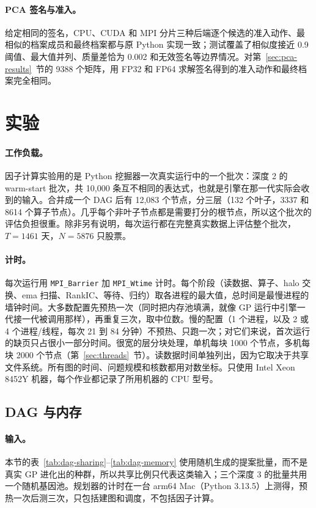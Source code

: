 \documentclass[11pt,a4paper,UTF8,fontset=fandol]{ctexart}
\newcommand{\code}[1]{\texttt{#1}}
\begin{document}
\paragraph{PCA 签名与准入。}给定相同的签名，CPU、CUDA 和 MPI 分片三种后端逐个候选的准入动作、最相似的档案成员和最终档案都与原 Python 实现一致；测试覆盖了相似度接近 0.9 阈值、最大值并列、质量差恰为 0.002 和无效签名等边界情况。对第~\ref{sec:pca-results}~节的 9388 个矩阵，用 FP32 和 FP64 求解签名得到的准入动作和最终档案完全相同。

\section{实验}
\label{sec:experiments}
\paragraph{工作负载。}因子计算实验用的是 Python 挖掘器一次真实运行中的一个批次：深度 2 的 warm-start 批次，共 10{,}000 条互不相同的表达式，也就是引擎在那一代实际会收到的输入。合并成一个 DAG 后有 12{,}083 个节点，分三层（132 个叶子，3337 和 8614 个算子节点）。几乎每个非叶子节点都是需要打分的根节点，所以这个批次的评估负担很重。除非另有说明，每次运行都在完整真实数据上评估整个批次，$T=1461$ 天，$N=5876$ 只股票。

\paragraph{计时。}每次运行用 \code{MPI\_Barrier} 加 \code{MPI\_Wtime} 计时。每个阶段（读数据、算子、halo 交换、ema 扫描、RankIC、等待、归约）取各进程的最大值，总时间是最慢进程的墙钟时间。大多数配置先预热一次（同时把内存池填满，就像 GP 运行中引擎一代接一代被调用那样），再重复三次，取中位数。慢的配置（1 个进程，以及 2 或 4 个进程/线程，每次 21 到 84 分钟）不预热、只跑一次；对它们来说，首次运行的缺页只占很小一部分时间。很宽的层分块处理，单机每块 1000 个节点，多机每块 2000 个节点（第~\ref{sec:threads}~节）。读数据时间单独列出，因为它取决于共享文件系统。所有图的时间、问题规模和核数都用对数坐标。只使用 Intel Xeon 8452Y 机器，每个作业都记录了所用机器的 CPU 型号。

\subsection{DAG 与内存}
\label{sec:dag-exp}
\paragraph{输入。}本节的表~\ref{tab:dag-sharing}--\ref{tab:dag-memory} 使用随机生成的提案批量，而不是真实 GP 进化出的种群，所以共享比例只代表这类输入；三个深度 3 的批量共用一个随机基因池。规划器的计时在一台 arm64 Mac（Python 3.13.5）上测得，预热一次后测三次，只包括建图和调度，不包括因子计算。
\end{document}
